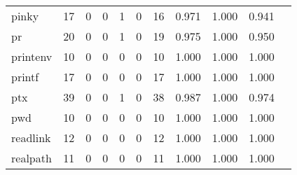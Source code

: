 \begin{longtable}{lp{1.10cm}p{1.10cm}p{1.10cm}p{1.10cm}p{1.10cm}p{1.10cm}p{1.10cm}p{1.10cm}p{1.10cm}p{1.10cm}}
pinky     &                     17 &                                  0 &                                 0 &                                1 &                                 0 &                              16 &                          0.971 &                                 1.000 &                               0.941 \\
pr        &                     20 &                                  0 &                                 0 &                                1 &                                 0 &                              19 &                          0.975 &                                 1.000 &                               0.950 \\
printenv  &                     10 &                                  0 &                                 0 &                                0 &                                 0 &                              10 &                          1.000 &                                 1.000 &                               1.000 \\
printf    &                     17 &                                  0 &                                 0 &                                0 &                                 0 &                              17 &                          1.000 &                                 1.000 &                               1.000 \\
ptx       &                     39 &                                  0 &                                 0 &                                1 &                                 0 &                              38 &                          0.987 &                                 1.000 &                               0.974 \\
pwd       &                     10 &                                  0 &                                 0 &                                0 &                                 0 &                              10 &                          1.000 &                                 1.000 &                               1.000 \\
readlink  &                     12 &                                  0 &                                 0 &                                0 &                                 0 &                              12 &                          1.000 &                                 1.000 &                               1.000 \\
realpath  &                     11 &                                  0 &                                 0 &                                0 &                                 0 &                              11 &                          1.000 &                                 1.000 &                               1.000 \\

\end{longtable}
